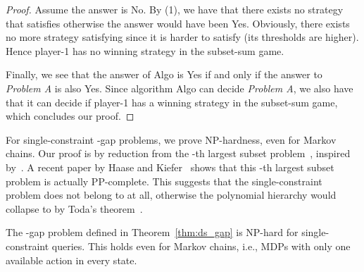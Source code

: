 \documentclass{llncs}
\newcommand\NPTIME{\textrm{\sf NP}}
\begin{document}
\begin{proof}
Assume the answer is \textsf{No}. By (1), we have that there exists no strategy  that satisfies  otherwise the answer would have been \textsf{Yes}. Obviously, there exists no more strategy satisfying  since it is harder to satisfy (its thresholds are higher). Hence player-1 has no winning strategy in the subset-sum game.

Finally, we see that the answer of \textsf{Algo} is \textsf{Yes} if and only if the answer to \textit{Problem A} is also \textsf{Yes}. Since algorithm \textsf{Algo} can decide \textit{Problem A}, we also have that it can decide if player-1 has a winning strategy in the subset-sum game, which concludes our proof.
\end{proof}

For single-constraint -gap problems, we prove \NPTIME-hardness, even for Markov chains. Our proof is by reduction from the -th largest subset problem~\cite{garey_FNY1979}, inspired by~\cite[Theorem 11]{DBLP:conf/stacs/BruyereFRR14}. A recent paper by Haase and Kiefer~\cite{HaasePP} shows that this -th largest subset problem is actually \textsf{PP}-complete. This suggests that the single-constraint problem does not belong to  at all, otherwise the polynomial hierarchy would collapse to  by Toda's theorem~\cite{toda1991pp}.


\begin{lemma}
\label{lem:ds_np_hard}
The -gap problem defined in Theorem~\ref{thm:ds_gap} is \NPTIME-hard for single-constraint queries. This holds even for Markov chains, i.e., MDPs with only one available action in every state.
\end{lemma}
\end{document}
